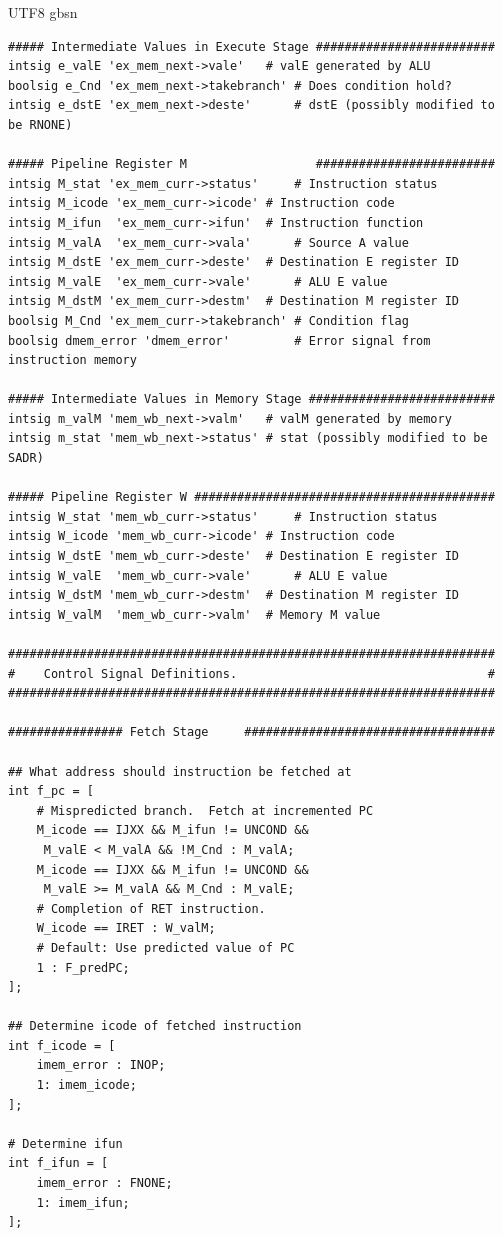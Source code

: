 \documentclass {article}
\begin{document}
\begin {CJK*} {UTF8} {gbsn}
\begin{lstlisting}
##### Intermediate Values in Execute Stage #########################
intsig e_valE 'ex_mem_next->vale'	# valE generated by ALU
boolsig e_Cnd 'ex_mem_next->takebranch' # Does condition hold?
intsig e_dstE 'ex_mem_next->deste'      # dstE (possibly modified to be RNONE)

##### Pipeline Register M                  #########################
intsig M_stat 'ex_mem_curr->status'     # Instruction status
intsig M_icode 'ex_mem_curr->icode'	# Instruction code
intsig M_ifun  'ex_mem_curr->ifun'	# Instruction function
intsig M_valA  'ex_mem_curr->vala'      # Source A value
intsig M_dstE 'ex_mem_curr->deste'	# Destination E register ID
intsig M_valE  'ex_mem_curr->vale'      # ALU E value
intsig M_dstM 'ex_mem_curr->destm'	# Destination M register ID
boolsig M_Cnd 'ex_mem_curr->takebranch'	# Condition flag
boolsig dmem_error 'dmem_error'	        # Error signal from instruction memory

##### Intermediate Values in Memory Stage ##########################
intsig m_valM 'mem_wb_next->valm'	# valM generated by memory
intsig m_stat 'mem_wb_next->status'	# stat (possibly modified to be SADR)

##### Pipeline Register W ##########################################
intsig W_stat 'mem_wb_curr->status'     # Instruction status
intsig W_icode 'mem_wb_curr->icode'	# Instruction code
intsig W_dstE 'mem_wb_curr->deste'	# Destination E register ID
intsig W_valE  'mem_wb_curr->vale'      # ALU E value
intsig W_dstM 'mem_wb_curr->destm'	# Destination M register ID
intsig W_valM  'mem_wb_curr->valm'	# Memory M value

####################################################################
#    Control Signal Definitions.                                   #
####################################################################

################ Fetch Stage     ###################################

## What address should instruction be fetched at
int f_pc = [
	# Mispredicted branch.  Fetch at incremented PC
	M_icode == IJXX && M_ifun != UNCOND &&
	 M_valE < M_valA && !M_Cnd : M_valA;
	M_icode == IJXX && M_ifun != UNCOND &&
	 M_valE >= M_valA && M_Cnd : M_valE;
	# Completion of RET instruction.
	W_icode == IRET : W_valM;
	# Default: Use predicted value of PC
	1 : F_predPC;
];

## Determine icode of fetched instruction
int f_icode = [
	imem_error : INOP;
	1: imem_icode;
];

# Determine ifun
int f_ifun = [
	imem_error : FNONE;
	1: imem_ifun;
];


\end{lstlisting}
\end{CJK*}
\end{document}
